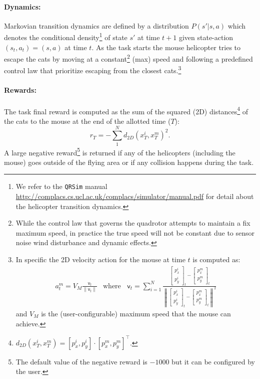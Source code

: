 \documentclass[a4paper,11pt]{report}
\newcommand{\webman}{\url{http://complacs.cs.ucl.ac.uk/complacs/simulator/manual.pdf}\xspace}
\begin{document}
\paragraph{Dynamics:} 
Markovian transition dynamics are defined by a distribution $P(s'|s,a)$ which denotes the conditional density\footnote{We refer to the \texttt{QRSim} manual \webman for detail about the helicopter transition dynamics.} of state $s'$ at time $t+1$ given state-action $(s_t,a_t)=(s,a)$ at
time $t$. As the task starts the mouse helicopter tries to escape the cats by moving at a constant\footnote{While the control law that governs the quadrotor attempts to maintain a fix maximum speed, in practice the true speed will not be constant due to sensor noise wind disturbance and dynamic effects.} (max) speed and following a predefined control law that prioritize escaping from the closest cats.\footnote{In specific the 2D velocity action for the mouse at time $t$ is computed as:
$$
\begin{array}{ll}
a^m_t = V_{M} \frac{\mathsf{v}_t}{\| \mathsf{v}_t \|} &
\text{where } \;\;\mathsf{v}_t = \sum_{i=1}^N \frac{\left[\begin{array}{c} p^i_x \\ p^i_y \end{array}\right]_t - \left[\begin{array}{c} p^m_x \\ p^m_y \end{array}\right]_t}{\left\| \left[\begin{array}{c} p^i_x \\ p^i_y \end{array}\right]_t - \left[\begin{array}{c} p^m_x \\ p^m_y \end{array}\right]_t \right\|^2}
\end{array}
$$
and $V_{M}$ is the (user-configurable) maximum speed that the mouse can achieve.  
}

\paragraph{Rewards:}
The task final reward is computed as the sum of the squared (2D) distances\footnote{$d_{2D}(x^i_T,x^m_T) = [p^i_x,p^i_y]\cdot[p^m_x,p^m_y]^\intercal$.} of the cats to the mouse at the end of the allotted time ($T$):
$$r_T = - \sum^N_1 d_{2D}(x^i_T,x^m_T)^2.$$
A large negative reward\footnote{The default value of the negative reward is $-1000$ but it can be configured by the user.} is returned if any of the helicopters (including the mouse) goes outside of the flying area or if any collision happens during the task.
\end{document}
